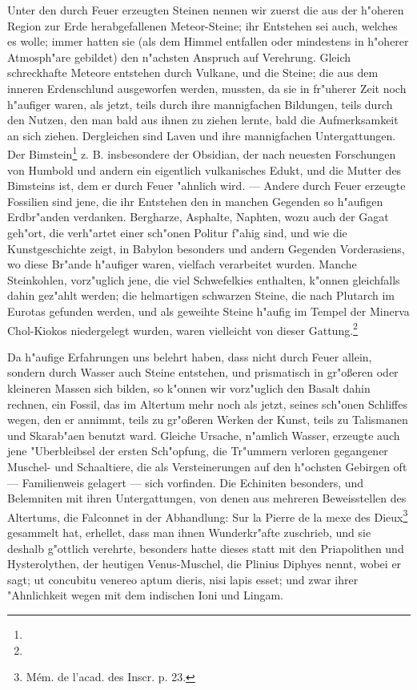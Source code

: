 \documentclass[a4paper, 11pt, oneside, polutonikogreek, german]{article}
\begin{document}
Unter den durch Feuer erzeugten Steinen nennen wir zuerst die aus der h"oheren Region zur Erde herabgefallenen Meteor-Steine; ihr Entstehen sei auch, welches es wolle; immer hatten sie (als dem Himmel entfallen oder mindestens in h"oherer Atmosph"are gebildet) den n"achsten Anspruch auf Verehrung. Gleich schreckhafte Meteore entstehen durch Vulkane, und die Steine; die aus dem inneren Erdenschlund ausgeworfen werden, mussten, da sie in fr"uherer Zeit noch h"aufiger waren, als jetzt, teils durch ihre mannigfachen Bildungen, teils durch den Nutzen, den man bald aus ihnen zu ziehen lernte, bald die Aufmerksamkeit an sich ziehen. Dergleichen sind Laven und ihre mannigfachen Untergattungen. Der Bimstein\footnote{} z. B. insbesondere der Obsidian, der nach neuesten Forschungen von Humbold und andern ein eigentlich vulkanisches Edukt, und die Mutter des Bimsteins ist, dem er durch Feuer "ahnlich wird. --- Andere durch Feuer erzeugte Fossilien sind jene, die ihr Entstehen den in manchen Gegenden so h"aufigen Erdbr"anden verdanken. Bergharze, Asphalte, Naphten, wozu auch der Gagat geh"ort, die verh"artet einer sch"onen Politur f"ahig sind, und wie die Kunstgeschichte zeigt, in Babylon besonders und andern Gegenden Vorderasiens, wo diese Br"ande h"aufiger waren, vielfach verarbeitet wurden. Manche Steinkohlen, vorz"uglich jene, die viel Schwefelkies enthalten, k"onnen gleichfalls dahin gez"ahlt werden; die helmartigen schwarzen Steine, die nach Plutarch im Eurotas gefunden werden, und als geweihte Steine h"aufig im Tempel der Minerva Chol-Kiokos niedergelegt wurden, waren vielleicht von dieser Gattung.\footnote{}

Da h"aufige Erfahrungen uns belehrt haben, dass nicht durch Feuer allein, sondern durch Wasser auch Steine entstehen, und prismatisch in gr"oßeren oder kleineren Massen sich bilden, so k"onnen wir vorz"uglich den Basalt dahin rechnen, ein Fossil, das im Altertum mehr noch als jetzt, seines sch"onen Schliffes wegen, den er annimmt, teils zu gr"oßeren Werken der Kunst, teils zu Talismanen und Skarab"aen benutzt ward. Gleiche Ursache, n"amlich Wasser, erzeugte auch jene "Uberbleibsel der ersten Sch"opfung, die Tr"ummern verloren gegangener Muschel- und Schaaltiere, die als Versteinerungen auf den h"ochsten Gebirgen oft --- Familienweis gelagert --- sich vorfinden. Die Echiniten besonders, und Belemniten mit ihren Untergattungen, von denen aus mehreren Beweisstellen des Altertums, die Falconnet in der Abhandlung: Sur la Pierre de la mexe des Dieux\footnote{Mém. de l'acad. des Inscr. p. 23.} gesammelt hat, erhellet, dass man ihnen Wunderkr"afte zuschrieb, und sie deshalb g"ottlich verehrte, besonders hatte dieses statt mit den Priapolithen und Hysterolythen, der heutigen Venus-Muschel, die Plinius Diphyes nennt, wobei er sagt; ut concubitu venereo aptum dieris, nisi lapis esset; und zwar ihrer "Ahnlichkeit wegen mit dem indischen Ioni und Lingam.
\end{document}
